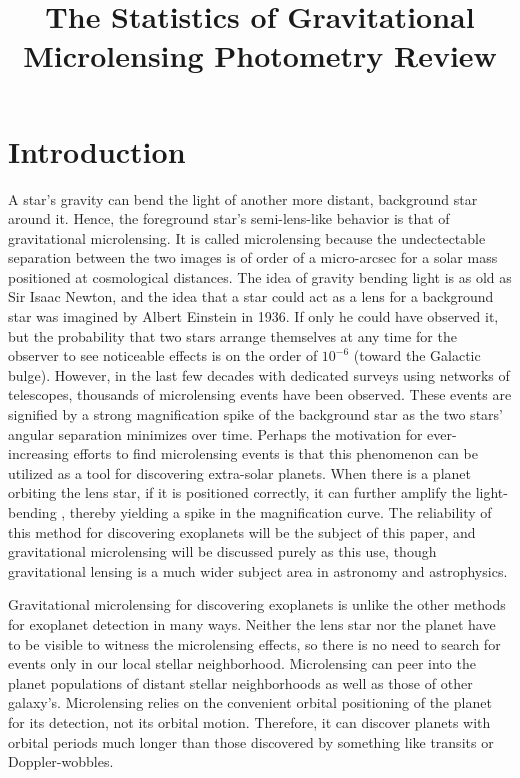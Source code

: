 \documentclass[12pt, a4paper, twocolumn]{article}
\author{}
\title{The Statistics of Gravitational Microlensing Photometry Review}
\date{}
\begin{document}
\maketitle

\section{Introduction}

A star's gravity can bend the light of another more distant, background star around it.
Hence, the foreground star's semi-lens-like behavior is that of gravitational microlensing.
It is called microlensing because the undectectable separation between the two images is of order of a micro-arcsec for a solar mass positioned at cosmological distances.
The idea of gravity bending light is as old as Sir Isaac Newton,
and the idea that a star could act as a lens for a background star was imagined by Albert Einstein in 1936.
\cite{gaudi}
If only he could have observed it, but the probability that two stars arrange themselves at any time for the observer to see noticeable effects is on the order of $10^{-6}$ (toward the Galactic bulge)\cite{gaudi}. 
However, in the last few decades with dedicated surveys using networks of telescopes, thousands of microlensing events have been observed.
These events are signified by a strong magnification spike of the background star as the two stars' angular separation minimizes over time.
Perhaps the motivation for ever-increasing efforts to find microlensing events is that
this phenomenon can be utilized as a tool for discovering extra-solar planets.
When there is a planet orbiting the lens star, if it is positioned correctly, it can further amplify the light-bending
, thereby yielding a spike in the magnification curve.
The reliability of this method for discovering exoplanets will be the subject of this paper,
and gravitational microlensing will be discussed purely as this use, though gravitational lensing is a much wider subject area in astronomy and astrophysics.

Gravitational microlensing for discovering exoplanets is unlike the other methods for exoplanet detection in many ways.
Neither the lens star nor the planet have to be visible to witness the microlensing effects, so there is no need to search for events only in our local stellar neighborhood.
Microlensing can peer into the planet populations of distant stellar neighborhoods as well as those of other galaxy's.
\cite{martin}
Microlensing relies on the convenient orbital positioning of the planet for its detection, not its orbital motion.
Therefore, it can discover planets with orbital periods much longer than those discovered by something like transits or Doppler-wobbles.
\end{document}
